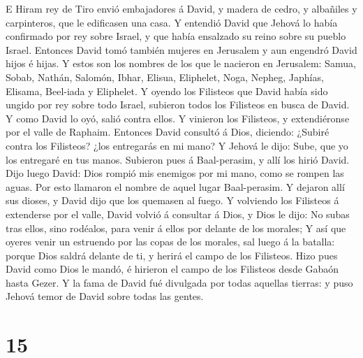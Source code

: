  E Hiram rey de Tiro envió embajadores á David, y madera
de cedro, y albañiles y carpinteros, que le edificasen una casa.
 Y entendió David que Jehová lo había confirmado por rey
sobre Israel, y que había ensalzado su reino sobre su pueblo Israel.
 Entonces David tomó también mujeres en Jerusalem y aun
engendró David hijos é hijas.  Y estos son los nombres de
los que le nacieron en Jerusalem: Samua, Sobab, Nathán, Salomón,
 Ibhar, Elisua, Eliphelet,  Noga, Nepheg,
Japhías,  Elisama, Beel-iada y Eliphelet.  Y
oyendo los Filisteos que David había sido ungido por rey sobre todo
Israel, subieron todos los Filisteos en busca de David. Y como David lo
oyó, salió contra ellos.  Y vinieron los Filisteos, y
extendiéronse por el valle de Raphaim.  Entonces David
consultó á Dios, diciendo: ¿Subiré contra los Filisteos? ¿los entregarás
en mi mano? Y Jehová le dijo: Sube, que yo los entregaré en tus manos.
 Subieron pues á Baal-perasim, y allí los hirió David.
Dijo luego David: Dios rompió mis enemigos por mi mano, como se rompen
las aguas. Por esto llamaron el nombre de aquel lugar Baal-perasim.
 Y dejaron allí sus dioses, y David dijo que los quemasen
al fuego.  Y volviendo los Filisteos á extenderse por el
valle,  David volvió á consultar á Dios, y Dios le dijo:
No subas tras ellos, sino rodéalos, para venir á ellos por delante de
los morales;  Y así que oyeres venir un estruendo por las
copas de los morales, sal luego á la batalla: porque Dios saldrá delante
de ti, y herirá el campo de los Filisteos.  Hizo pues
David como Dios le mandó, é hirieron el campo de los Filisteos desde
Gabaón hasta Gezer.  Y la fama de David fué divulgada por
todas aquellas tierras: y puso Jehová temor de David sobre todas las
gentes.

\hypertarget{section-14}{%
\section{15}\label{section-14}}


